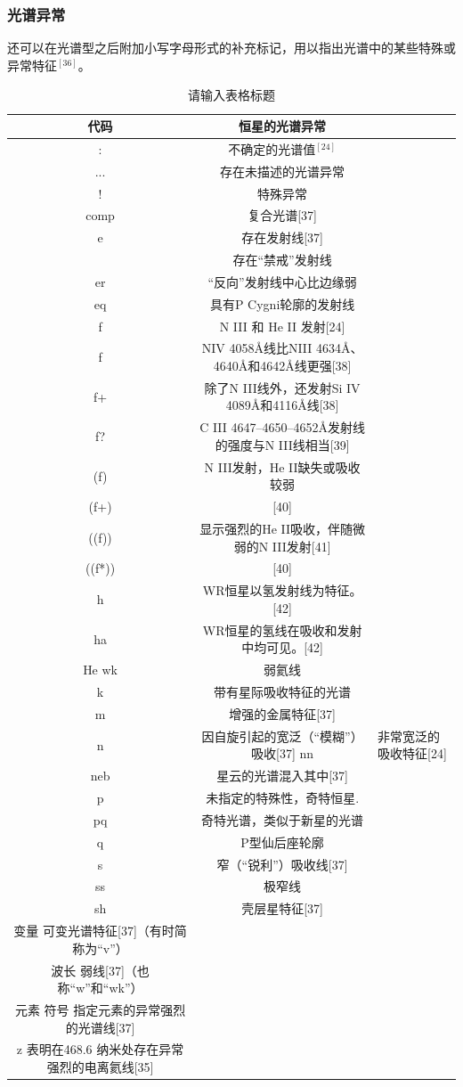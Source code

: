 \subsubsection{光谱异常}
还可以在光谱型之后附加小写字母形式的补充标记，用以指出光谱中的某些特殊或异常特征$^{[36]}$。
\begin{table}[ht]
\centering
\caption{请输入表格标题}\label{tab_Stcl1}
\begin{tabular}{|c|c|}
\hline
\textbf{代码} & \textbf{恒星的光谱异常} \\
\hline
: & 不确定的光谱值$^{[24]}$\\
\hline
... & 存在未描述的光谱异常\\
\hline
! & 特殊异常\\
\hline
comp & 复合光谱[37]\\
\hline
e & 存在发射线[37]\\
\hline
[e] & 存在“禁戒”发射线\\
\hline
er & “反向”发射线中心比边缘弱\\
\hline
eq & 具有P Cygni轮廓的发射线\\
\hline
f & N III 和 He II 发射[24]\\
\hline
f & NIV 4058Å线比NIII 4634Å、4640Å和4642Å线更强[38]\\
\hline
f+ & 除了N III线外，还发射Si IV 4089Å和4116Å线[38]\\
\hline
f? & C III 4647–4650–4652Å发射线的强度与N III线相当[39]\\
\hline
(f) & N III发射，He II缺失或吸收较弱\\
\hline
(f+) & [40]\\
\hline
((f)) & 显示强烈的He II吸收，伴随微弱的N III发射[41]\\
\hline
((f*)) & [40]\\
\hline
h & WR恒星以氢发射线为特征。[42]\\
\hline
ha & WR恒星的氢线在吸收和发射中均可见。[42]\\
\hline
He wk & 弱氦线\\
\hline
k & 带有星际吸收特征的光谱\\
\hline
m & 增强的金属特征[37]\\
\hline
n & 因自旋引起的宽泛（“模糊”）吸收[37]
\hline
nn & 非常宽泛的吸收特征[24]\\
\hline
neb & 星云的光谱混入其中[37]\\
\hline
p & 未指定的特殊性，奇特恒星.\\
\hline
pq & 奇特光谱，类似于新星的光谱\\
\hline
q & P型仙后座轮廓\\
\hline
s & 窄（“锐利”）吸收线[37]\\
\hline
ss & 极窄线\\
\hline
sh & 壳层星特征[37]\\
\hline
变量	可变光谱特征[37]（有时简称为“v”）\\
\hline
波长	弱线[37]（也称“w”和“wk”）\\
\hline
元素
符号	指定元素的异常强烈的光谱线[37]\\
\hline
z	表明在468.6 纳米处存在异常强烈的电离氦线[35] \\
\hline
\end{tabular}
\end{table}